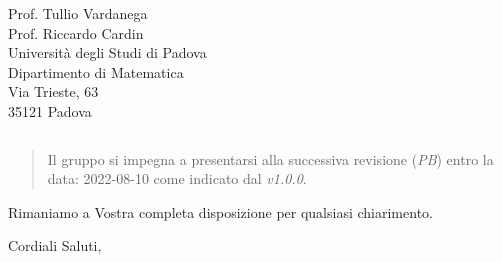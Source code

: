 \documentclass{articoletteracdp}
\begin{document}
\begin{letter}{
			Prof. Tullio Vardanega \\
			Prof. Riccardo Cardin \\
			Università degli Studi di Padova \\
			Dipartimento di Matematica \\
			Via Trieste, 63 \\
			35121 Padova
		}
\begin{quotation}
\begin{center}
\begin{tabular}{ c | c }
						\hline
					\end{tabular}
				\end{center}
			
		\end{quotation}

		\begin{quotation}
			\noindent
			Il gruppo si impegna a presentarsi alla successiva revisione (\textit{PB}) entro la data:
			2022-08-10 come indicato dal \PdP{} \textit{v1.0.0}.
		\end{quotation}

		\vspace{0.5cm}
		Rimaniamo a Vostra completa disposizione per qualsiasi chiarimento.

		\vspace{0.5cm}
		\closing{ Cordiali Saluti,}

	\end{letter}
\end{document}
